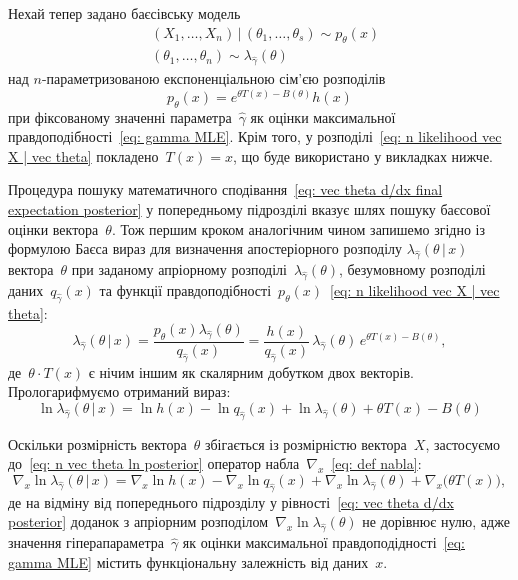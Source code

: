 Нехай тепер задано баєсівську модель
\begin{align}
    & (X_1,\ldots,X_n) \,|\, (\theta_1,\ldots,\theta_s) \sim p_{\theta}(x) \label{eq: duplicated vec X | vec theta} \\
    & (\theta_1,\ldots,\theta_n) \sim \lambda_{\widehat{\gamma}}(\theta) \label{eq: vec n theta}
\end{align} 
над $n$-параметризованою експоненціальною сім'єю розподілів 
\begin{equation}\label{eq: n likelihood vec X | vec theta}
    p_{\theta}(x) = e^{\theta T(x) - B(\theta)}h(x)
\end{equation}
при фіксованому значенні параметра~$\widehat{\gamma}$ як оцінки максимальної правдоподібності~\eqref{eq: gamma MLE}. Крім того, у розподілі~\eqref{eq: n likelihood vec X | vec theta} покладено~$T(x)=x$, що буде використано у викладках нижче.

Процедура пошуку математичного сподівання~\eqref{eq: vec theta d/dx final expectation posterior} у попередньому підрозділі вказує шлях пошуку баєсової оцінки вектора~$\theta$. Тож першим кроком аналогічним чином запишемо згідно із формулою Баєса вираз для визначення апостеріорного розподілу $\lambda_{\widehat{\gamma}}(\theta \,|\, x)$ вектора~$\theta$ при заданому апріорному розподілі~$\lambda_{\widehat{\gamma}}(\theta)$, безумовному розподілі даних~$q_{\widehat{\gamma}}(x)$ та функції правдоподібності~$p_{\theta}(x)$~\eqref{eq: n likelihood vec X | vec theta}:
\begin{equation}\label{eq: n vec theta posterior}
    \lambda_{\widehat{\gamma}}(\theta \,|\, x) = \frac{p_{\theta}(x)\lambda_{\widehat{\gamma}}(\theta)}{q_{\widehat{\gamma}}(x)} = 
    \frac{h(x)}{q_{\widehat{\gamma}}(x)}\,\lambda_{\widehat{\gamma}}(\theta)\,e^{\theta T(x) - B(\theta)},
\end{equation}
де~$\theta \cdot T(x)$ є нічим іншим як скалярним добутком двох векторів. Прологарифмуємо отриманий вираз:
\begin{equation}\label{eq: n vec theta ln posterior}
    \ln{\lambda_{\widehat{\gamma}}(\theta \,|\, x)} = \ln{h(x)} - \ln{q_{\widehat{\gamma}}(x)} + \ln{\lambda_{\widehat{\gamma}}(\theta)} + \theta T(x) - B(\theta)
\end{equation}

Оскільки розмірність вектора~$\theta$ збігається із розмірністю вектора~$X$, застосуємо до~\eqref{eq: n vec theta ln posterior} оператор набла~$\nabla_x$~\eqref{eq: def nabla}:
\begin{equation}\label{eq: vec theta nabla posterior}
    \nabla_x\ln{\lambda_{\widehat{\gamma}}(\theta \,|\, x)} = \nabla_x\ln{h(x)} - \nabla_x\ln{q_{\widehat{\gamma}}(x)} +  \nabla_x\ln{\lambda_{\widehat{\gamma}}(\theta)} + \nabla_x\bigl( \theta T(x) \bigr),
\end{equation}
де на відміну від попереднього підрозділу у рівності~\eqref{eq: vec theta d/dx posterior} доданок з апріорним розподілом~$\nabla_x\ln{\lambda_{\widehat{\gamma}}(\theta)}$ не дорівнює нулю, адже значення гіперапараметра~$\widehat{\gamma}$ як оцінки максимальної правдоподідності~\eqref{eq: gamma MLE} містить функціональну залежність від даних~$x$.

